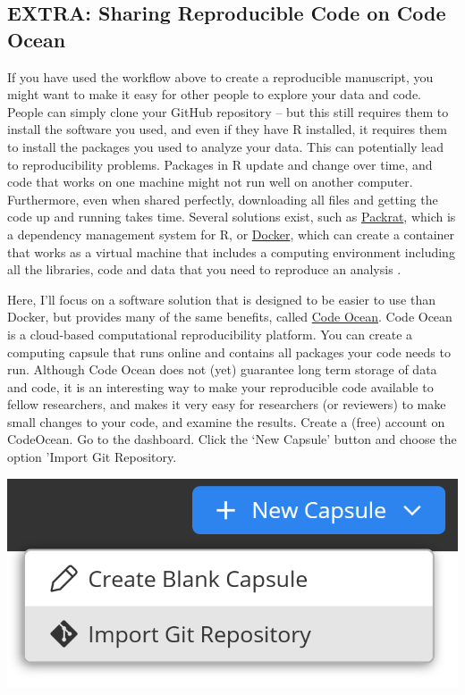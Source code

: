 \documentclass[
  oneside]{krantz}
\begin{document}
\hypertarget{extra-sharing-reproducible-code-on-code-ocean}{%
\subsection{EXTRA: Sharing Reproducible Code on Code Ocean}\label{extra-sharing-reproducible-code-on-code-ocean}}

If you have used the workflow above to create a reproducible manuscript, you might want to make it easy for other people to explore your data and code. People can simply clone your GitHub repository -- but this still requires them to install the software you used, and even if they have R installed, it requires them to install the packages you used to analyze your data. This can potentially lead to reproducibility problems. Packages in R update and change over time, and code that works on one machine might not run well on another computer. Furthermore, even when shared perfectly, downloading all files and getting the code up and running takes time. Several solutions exist, such as
\href{https://rstudio.github.io/packrat/rstudio.html}{Packrat}, which is a dependency management system for R, or \href{http://www.docker.com}{Docker}, which can create a container that works as a virtual machine that includes a computing environment including all the libraries, code and data that you need to reproduce an analysis \citep{wiebels_leveraging_2021}.

Here, I'll focus on a software solution that is designed to be easier to use than Docker, but provides many of the same benefits, called \href{https://codeocean.com/}{Code Ocean}. Code Ocean is a cloud-based computational reproducibility platform. You can create a computing capsule that runs online and contains all packages your code needs to run. Although Code Ocean does not (yet) guarantee long term storage of data and code, it is an interesting way to make your reproducible code available to fellow researchers, and makes it very easy for researchers (or reviewers) to make small changes to your code, and examine the results. Create a (free) account on CodeOcean. Go to the dashboard.
Click the `New Capsule' button and choose the option 'Import Git Repository.

\begin{center}\includegraphics[width=1\linewidth]{images/b27f6ddcc48c4b808418612be7efd929} \end{center}
\end{document}
